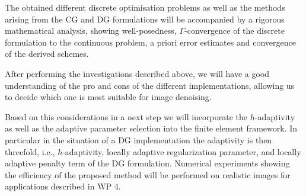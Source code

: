 \documentclass[enabledeprecatedfontcommands,cleardoublepage=empty,headsepline,twoside,11pt,DIV=15,BCOR=12mm,final]{scrartcl}
\begin{document}
  The obtained different discrete optimisation problems as well as the methods arising from the CG and DG formulations will be accompanied by a rigorous mathematical analysis, showing well-posedness,  $\Gamma$-convergence of the discrete formulation to the continuous problem, a priori error estimates and convergence of the derived schemes.
  
  After performing the investigations described above, we will have a good understanding of the pro and cons of the different implementations, allowing us to decide which one is most suitable for image denoising. 

Based on this considerations in a next step we will incorporate the $h$-adaptivity as well as the adaptive parameter selection into the finite element framework. In particular in the situation of a DG implementation the adaptivity is then threefold, i.e., $h$-adaptivity, locally adaptive regularization parameter, and locally adaptive penalty term of the DG formulation. Numerical experiments showing the efficiency of the proposed method will be performed on realistic images for applications described in WP 4. %

  
\end{document}
